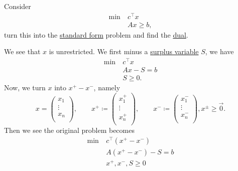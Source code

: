 \begin{eg}
	Consider
	\[
		\begin{aligned}
			\min~ & c^{\top}x  \\
			      & Ax \geq b,
		\end{aligned}
	\]
	turn this into the \hyperref[def:standard-form]{standard form} problem and find the \hyperref[def:dual]{dual}.
\end{eg}
\begin{explanation}
	We see that \(x\) is unrestricted. We first minus a \hyperref[def:surplus-variable]{surplus variable} \(S\), we have
	\[
		\begin{aligned}
			\min~ & c^{\top}x \\
			      & Ax - S= b \\
			      & S \geq 0.
		\end{aligned}
	\]
	Now, we turn \(x\) into \(x^+ - x^-\), namely
	\[
		x = \begin{pmatrix}
			x_1    \\
			\vdots \\
			x_n    \\
		\end{pmatrix},\qquad
		x^+ \coloneqq \begin{pmatrix}
			x^+_1  \\
			\vdots \\
			x^+_n  \\
		\end{pmatrix},\qquad
		x^- \coloneqq \begin{pmatrix}
			x^-_1  \\
			\vdots \\
			x^-_n  \\
		\end{pmatrix}, x^\pm \geq \vec{0}.
	\]
	Then we see the original problem becomes
	\[
		\begin{aligned}
			\min~ & c^{\top}(x^+ - x^-)  \\
			      & A(x^+ - x^-) - S = b \\
			      & x^+, x^-, S \geq 0
		\end{aligned}
	\]


\end{explanation}
